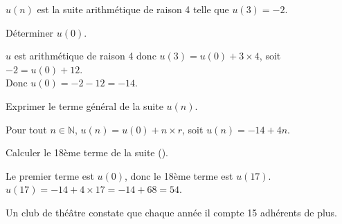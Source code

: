 \documentclass[11pt,a4paper]{article}  %
\begin{document}
$u(n)$ est la suite arithmétique de raison 4 telle que $u(3)=-2$.
\begin{enumMet}
	\item Déterminer $u(0)$.
	\par
	\begin{corrBox}
		$u$ est arithmétique de raison 4 donc $u(3)=u(0)+3\times 4$, soit $-2=u(0)+12$.\\
		Donc $u(0)=-2-12=-14$.
	\end{corrBox}

	\item Exprimer le terme général de la suite $u(n)$.
	\par
	\begin{corrBox}
		Pour tout $n\in\mathbb{N}$, $u(n)=u(0)+n\times r$, soit $u(n)=-14+4n$.
	\end{corrBox}

	\item Calculer le 18ème terme de la suite (\danger).
	\par
	\begin{corrBox}
		Le premier terme est $u(0)$, donc le 18ème terme est $u(17)$.\\
		$u(17)=-14+4\times 17=-14+68=54$.
	\end{corrBox}
\end{enumMet}


Un club de théâtre constate que chaque année il compte 15 adhérents de plus.
\end{document}
